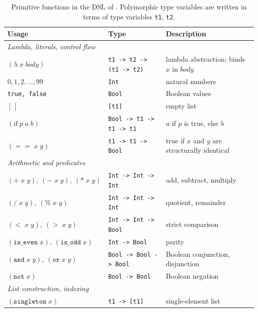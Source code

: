 \documentclass[12pt]{article}
\begin{document}
\begin{table}[!htbp]
\centering
\caption{Primitive functions in the DSL of \citep{rule2024symbolic}. Polymorphic type variables are written in terms of type variables \texttt{t1}, \texttt{t2}.}
\label{tab:dsl-primitives}
\tiny
\begin{tabular}{lll}
\toprule
Usage & Type & Description \\
\midrule
\multicolumn{3}{l}{\textit{Lambda, literals, control flow}} \\
$(\lambda\;x\;\mathit{body})$           & \texttt{t1 -> t2 -> (t1 -> t2)}   & lambda abstraction; binds $x$ in $\mathit{body}$ \\
$0, 1, 2, \ldots, 99$                   & \texttt{Int}                       & natural numbers \\
\texttt{true, false}                    & \texttt{Bool}                      & Boolean values \\
$[\,]$                                  & \texttt{[t1]}                      & empty list \\
$(\mathrm{if}\;p\;a\;b)$                & \texttt{Bool -> t1 -> t1 -> t1}   & $a$ if $p$ is true, else $b$ \\
$(==\;x\;y)$                            & \texttt{t1 -> t1 -> Bool}         & true if $x$ and $y$ are structurally identical \\
\midrule
\multicolumn{3}{l}{\textit{Arithmetic and predicates}} \\
$(+\;x\;y),\ (-\;x\;y),\ (*\;x\;y)$     & \texttt{Int -> Int -> Int}        & add, subtract, multiply \\
$(/\;x\;y),\ (\%\;x\;y)$                & \texttt{Int -> Int -> Int}        & quotient, remainder \\
$(<\;x\;y),\ (>\;x\;y)$                 & \texttt{Int -> Int -> Bool}       & strict comparison \\
$(\texttt{is\_even}\;x),\ (\texttt{is\_odd}\;x)$ & \texttt{Int -> Bool}      & parity \\
$(\texttt{and}\;x\;y),\ (\texttt{or}\;x\;y)$ & \texttt{Bool -> Bool -> Bool} & Boolean conjunction, disjunction \\
$(\texttt{not}\;x)$                     & \texttt{Bool -> Bool}             & Boolean negation \\
\midrule
\multicolumn{3}{l}{\textit{List construction, indexing}} \\
$(\texttt{singleton}\;x)$               & \texttt{t1 -> [t1]}               & single-element list \\

\end{tabular}
\end{table}
\end{document}
